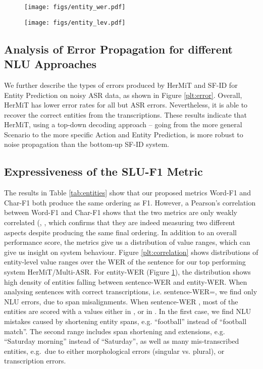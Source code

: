 \documentclass[11pt,a4paper]{article}
\newcommand{\metricname}{SLU-F1}
\newcommand{\werm}{Word-F1}
\newcommand{\levm}{Char-F1}
\newcommand{\nlu}{NLU}
\newcommand{\wer}{WER}
\newcommand{\hermit}{HerMiT}
\newcommand{\sfid}{SF-ID}
\newcommand{\masr}{Multi-ASR}
\begin{document}
\begin{figure*}[t]
\centering
  \begin{subfigure}[b]{0.45\textwidth}
    \texttt{[image: figs/entity\_wer.pdf]}
    \caption{\label{plt:werf1}}
  \end{subfigure}
\begin{subfigure}[b]{0.45\textwidth}
    \texttt{[image: figs/entity\_lev.pdf]}
    \caption{\label{plt:levf1}}
  \end{subfigure}
      \caption{Correlation between sentence-level WER (intervals of 0.5) and entity-level (a) WER values (intervals of 0.5), (b) normalised character-based Levenshtein values (intervals of 0.1).\label{plt:correlation}} \end{figure*}

\subsection{Analysis of Error Propagation for different NLU Approaches} 
We further describe the types of errors produced by \hermit{} and \sfid{} for Entity Prediction on noisy ASR data, as shown in Figure \ref{plt:error}.
Overall, \hermit{} has lower error rates for all but ASR errors. Nevertheless, it is able to recover the correct entities from the transcriptions. 
These results indicate that \hermit{}, using a top-down decoding approach -- going from the more general Scenario to the more specific Action and Entity Prediction, is more robust to noise propagation than the bottom-up \sfid{} system.



\subsection{Expressiveness of the \metricname{} Metric}
The results in Table \ref{tab:entities} show that our proposed metrics \werm{} and \levm{} both produce the same ordering as F1. 
However, a Pearson's correlation between \werm{} and \levm{} shows that the two metrics are  only weakly correlated (, , which confirms that they are indeed measuring two different aspects despite producing the same final ordering.
In addition to an overall performance score, the metrics give us a distribution of value ranges, which
can give us insight on system behaviour. Figure \ref{plt:correlation} shows distributions of
entity-level  value ranges over the \wer{} of the sentence for our top performing system \hermit/\masr.
For entity-WER (Figure \ref{plt:werf1}), the distribution shows high density of entities falling between sentence-WER and entity-WER. When analysing sentences with correct transcriptions, i.e. sentence-WER=, we find only \nlu{} errors, due to span misalignments. When sentence-WER , most of the entities are scored with a values either in , or in . In the first case, we find \nlu{} mistakes caused by shortening entity spans, e.g. ``football'' instead of ``football match''. The second range includes span  shortening and extensions, e.g. ``Saturday morning'' instead of ``Saturday'', as well as many mis-transcribed entities, e.g.\ due to either morphological errors (singular vs. plural), or transcription errors. 
\end{document}
